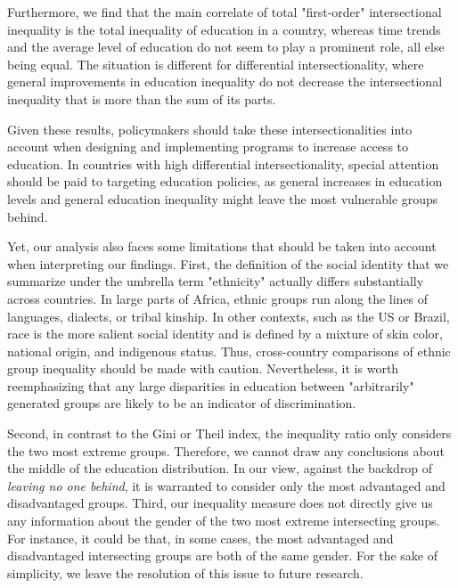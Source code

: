 Furthermore, we find that the main correlate of total "first-order" intersectional inequality is the total inequality of education in a country, whereas time trends and the average level of education do not seem to play a prominent role, all else being equal. The situation is different for differential intersectionality, where general improvements in education inequality do not decrease the intersectional inequality that is more than the sum of its parts. 
 
Given these results, policymakers should take these intersectionalities into account when designing and implementing programs to increase access to education. In countries with high differential intersectionality, special attention should be paid to targeting education policies, as general increases in education levels and general education inequality might leave the most vulnerable groups behind. 

Yet, our analysis also faces some limitations that should be taken into account when interpreting our findings. First, the definition of the social identity that we summarize under the umbrella term "ethnicity" actually differs substantially across countries. In large parts of Africa, ethnic groups run along the lines of languages, dialects, or tribal kinship. In other contexts, such as the US or Brazil, race is the more salient social identity and is defined by a mixture of skin color, national origin, and indigenous status. Thus, cross-country comparisons of ethnic group inequality should be made with caution. Nevertheless, it is worth reemphasizing that any large disparities in education between "arbitrarily" generated groups are likely to be an indicator of discrimination. 

Second, in contrast to the Gini or Theil index, the inequality ratio only considers the two most extreme groups. Therefore, we cannot draw any conclusions about the middle of the education distribution. In our view, against the backdrop of \textit{leaving no one behind}, it is warranted to consider only the most advantaged and disadvantaged groups. Third, our inequality measure does not directly give us any information about the gender of the two most extreme intersecting groups. For instance, it could be that, in some cases, the most advantaged and disadvantaged intersecting groups are both of the same gender. For the sake of simplicity, we leave the resolution of this issue to future research. 

